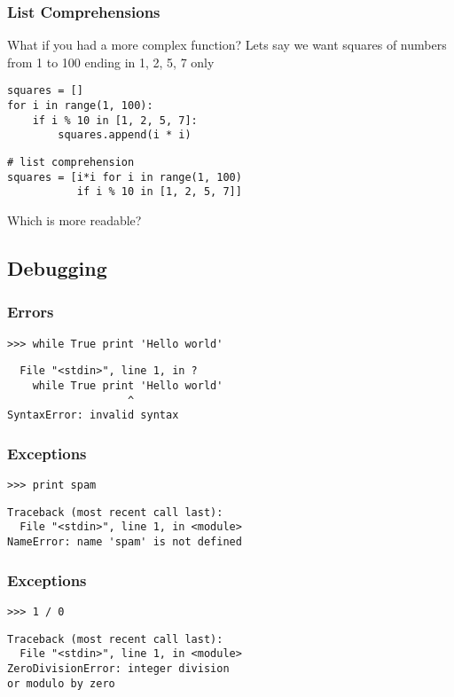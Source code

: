 \documentclass[14pt,compress]{beamer}
\newcounter{time}
\newcommand{\inctime}[1]{\addtocounter{time}{#1}{\tiny \thetime\ m}}
\begin{document}
\begin{frame}[fragile]
    \frametitle{List Comprehensions}
What if you had a more complex function?
Lets say we want squares of numbers from 1 to 100 ending in 1, 2, 5, 7 only
    \begin{lstlisting}
squares = []
for i in range(1, 100):
    if i % 10 in [1, 2, 5, 7]:
        squares.append(i * i)
    \end{lstlisting}
    \begin{lstlisting}
# list comprehension
squares = [i*i for i in range(1, 100)
           if i % 10 in [1, 2, 5, 7]]
     \end{lstlisting}
Which is more readable?
\inctime{15}
\end{frame}


\subsection{Debugging}
\begin{frame}[fragile]
 \frametitle{Errors}
 \begin{lstlisting}
>>> while True print 'Hello world'
 \end{lstlisting}
\pause
  \begin{lstlisting}
  File "<stdin>", line 1, in ?
    while True print 'Hello world'
                   ^
SyntaxError: invalid syntax
\end{lstlisting}
\end{frame}

\begin{frame}[fragile]
 \frametitle{Exceptions}
 \begin{lstlisting}
>>> print spam
\end{lstlisting}
\pause
\begin{lstlisting}
Traceback (most recent call last):
  File "<stdin>", line 1, in <module>
NameError: name 'spam' is not defined
\end{lstlisting}
\end{frame}

\begin{frame}[fragile]
 \frametitle{Exceptions}
 \begin{lstlisting}
>>> 1 / 0
\end{lstlisting}
\pause
\begin{lstlisting}
Traceback (most recent call last):
  File "<stdin>", line 1, in <module>
ZeroDivisionError: integer division 
or modulo by zero
\end{lstlisting}
\end{frame}
\end{document}
